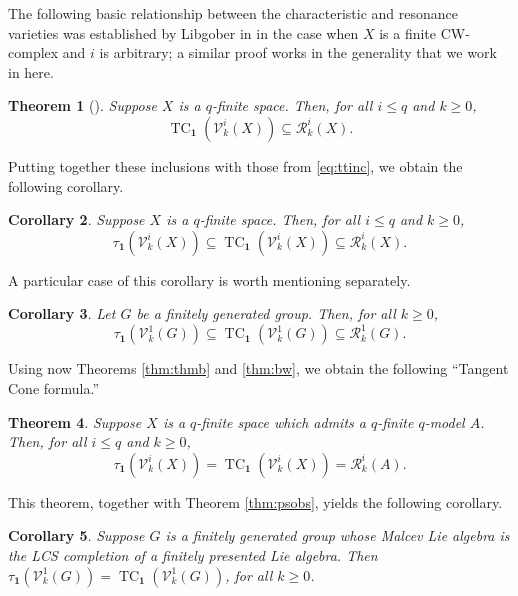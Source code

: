 \documentclass{article}
\numberwithin{equation}{section}
\newtheorem{theorem}{Theorem}[section]
\newtheorem{corollary}[theorem]{Corollary}
\theoremstyle{definition}
\newcommand{\VV}{\mathcal{V}}
\newcommand{\RR}{\mathcal{R}}
\DeclareMathOperator{\TC}{TC}
\newcommand{\one}{\mathbf{1}}
\begin{document}
The following basic relationship between the characteristic 
and resonance varieties was established by Libgober in \cite{Li02} in 
the case when $X$ is a finite CW-complex and $i$ is arbitrary; a similar 
proof works in the generality that we work in here.

\begin{theorem}[\cite{Li02}]
\label{thm:lib}
Suppose $X$ is a $q$-finite space.  Then, for all $i\le q$ and $k\ge 0$, 
\begin{equation}
\label{eq:tc lib}
\TC_{\one}(\VV^i_k(X))\subseteq \RR^i_k(X).
\end{equation}
\end{theorem}

Putting together these inclusions with those from \eqref{eq:ttinc}, 
we obtain the following corollary. 
\begin{corollary}
\label{cor:tcone inc}
Suppose $X$ is a $q$-finite space.  Then, for all $i\le q$ and $k\ge 0$, 
\begin{equation}
\label{eq:tc inc}
\tau_{\one}(\VV^i_k(X))\subseteq  
\TC_{\one}(\VV^i_k(X))\subseteq \RR^i_k(X).
\end{equation}
\end{corollary}

A particular case of this corollary is worth mentioning separately.

\begin{corollary}
\label{cor:tcone gps}
Let $G$ be a finitely generated group.  Then, for all $k\ge 0$, 
\[
\tau_{\one}(\VV^1_k(G))\subseteq  
\TC_{\one}(\VV^1_k(G))\subseteq \RR^1_k(G).
\]
\end{corollary}

Using now Theorems \ref{thm:thmb} and \ref{thm:bw}, we 
obtain the following ``Tangent Cone formula.''

\begin{theorem}
\label{thm:tcone-fm}
Suppose $X$ is a $q$-finite space which admits a $q$-finite $q$-model $A$.  
Then, for all $i\le q$ and 
$k\ge 0$,
\begin{equation}
\label{eq:tc-fm}
\tau_{\one}(\VV^i_k(X))=\TC_{\one}(\VV^i_k(X))=\RR^i_k(A).
\end{equation}
\end{theorem}

This theorem, together with Theorem \ref{thm:psobs}, yields the 
following corollary.

\begin{corollary}
\label{cor:malcone}
Suppose $G$ is a finitely generated group whose Malcev Lie algebra   
is the LCS completion of a finitely presented Lie algebra. Then 
$\tau_{\one}(\VV^1_k(G))=\TC_{\one}(\VV^1_k(G))$, for all $k\ge 0$.
\end{corollary}
\end{document}
